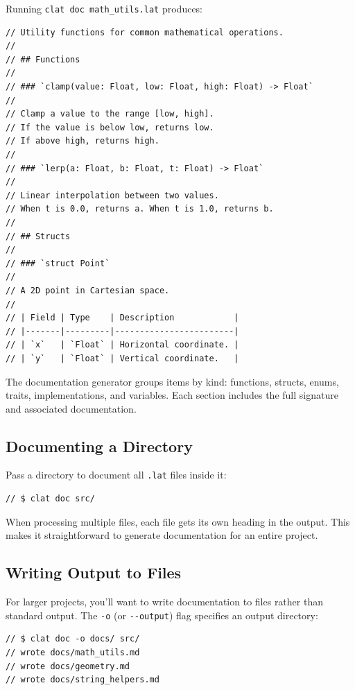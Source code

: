 Running \lstinline|clat doc math_utils.lat| produces:

\begin{lstlisting}[language=Lattice, caption={Generated Markdown output (abbreviated)}]
// Utility functions for common mathematical operations.
//
// ## Functions
//
// ### `clamp(value: Float, low: Float, high: Float) -> Float`
//
// Clamp a value to the range [low, high].
// If the value is below low, returns low.
// If above high, returns high.
//
// ### `lerp(a: Float, b: Float, t: Float) -> Float`
//
// Linear interpolation between two values.
// When t is 0.0, returns a. When t is 1.0, returns b.
//
// ## Structs
//
// ### `struct Point`
//
// A 2D point in Cartesian space.
//
// | Field | Type    | Description            |
// |-------|---------|------------------------|
// | `x`   | `Float` | Horizontal coordinate. |
// | `y`   | `Float` | Vertical coordinate.   |
\end{lstlisting}

The documentation generator groups items by kind: functions, structs, enums, traits, implementations, and variables.
Each section includes the full signature and associated documentation.

\subsection{Documenting a Directory}\label{sec:doc-directory}

Pass a directory to document all \lstinline|.lat| files inside it:

\begin{lstlisting}[language=Lattice, caption={Documenting an entire directory}]
// $ clat doc src/
\end{lstlisting}

When processing multiple files, each file gets its own heading in the output. This makes it straightforward to generate documentation for an entire project.

\subsection{Writing Output to Files}\label{sec:doc-output-dir}

For larger projects, you'll want to write documentation to files rather than standard output.
The \lstinline|-o| (or \lstinline|--output|) flag specifies an output directory:

\begin{lstlisting}[language=Lattice, caption={Writing docs to a directory}]
// $ clat doc -o docs/ src/
// wrote docs/math_utils.md
// wrote docs/geometry.md
// wrote docs/string_helpers.md
\end{lstlisting}

